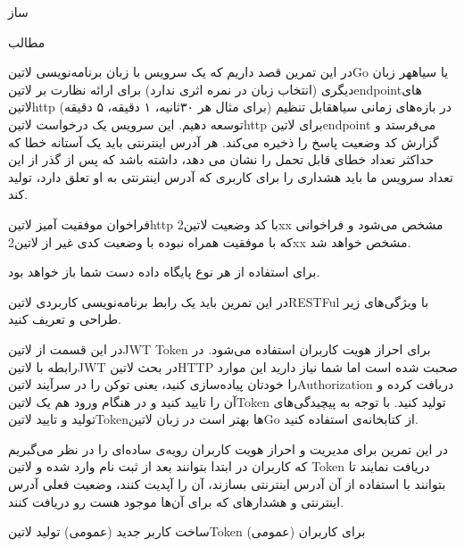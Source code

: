 \documentclass{../assignment}
\begin{document}
‌ساز

‌مطالب


در این تمرین قصد داریم که یک سرویس با زبان برنامه‌نویسی ‌لاتین{Go} یا ‌سیاه{هر زبان دیگری} (انتخاب زبان در نمره اثری ندارد) برای ارائه نظارت بر ‌لاتین{endpoint}های ‌لاتین{http} در بازه‌های زمانی ‌سیاه{قابل تنظیم} (برای مثال هر ۳۰ثانیه، ۱ دقیقه، ۵ دقیقه) توسعه دهیم. این سرویس یک درخواست ‌لاتین{http} برای ‌لاتین{endpoint} می‌فرستد
و گزارش کد وضعیت پاسخ را ذخیره می‌کند. هر آدرس اینترنتی باید یک آستانه خطا که حداکثر تعداد خطای قابل تحمل را نشان می دهد، داشته باشد که پس از گذر از این تعداد سرویس ما باید هشداری را برای کاربری که آدرس اینترنتی به او تعلق دارد، تولید کند.

فراخوان موفقیت آمیز ‌لاتین{http} با کد وضعیت ‌لاتین{2xx} مشخص می‌شود و فراخوانی که با موفقیت همراه نبوده با وضعیت کدی غیر از ‌لاتین{2xx} مشخص خواهد شد.


برای استفاده از هر نوع پایگاه داده دست شما باز خواهد بود.


در این تمرین باید یک رابط برنامه‌نویسی کاربردی ‌لاتین{RESTFul} با ویژگی‌های زیر طراحی و تعریف کنید.


در این قسمت از ‌لاتین{JWT Token} برای احراز هویت کاربران استفاده می‌شود. در رابطه با ‌لاتین{JWT} در بحث ‌لاتین{HTTP} صحبت شده است اما شما نیاز دارید
این موارد را خودتان پیاده‌سازی کنید، یعنی توکن را در سرآیند ‌لاتین{Authorization} دریافت کرده و آن را تایید کنید و در هنگام ورود هم یک ‌لاتین{Token} تولید کنید.
با توجه به پیچیدگی‌های تولید و تایید ‌لاتین{Token}ها بهتر است در زبان ‌لاتین{Go} از کتابخانه‌ی  استفاده کنید.


در این تمرین برای مدیریت و احراز هویت کاربران رویه‌ی ساده‌ای را در نظر می‌گبریم که کاربران در ابتدا بتوانند بعد از ثبت نام وارد شده و ‌لاتین {Token} دریافت نمایند
تا بتوانند با استفاده از آن آدرس اینترنتی بسازند، آن را آپدیت کنند،‌ وضعیت فعلی آدرس اینترنتی و هشدار‌های که برای آن‌ها موجود هست رو دریافت کنند.


 ساخت کاربر جدید (عمومی)
 تولید ‌لاتین{Token} برای کاربران (عمومی)
\end{document}

